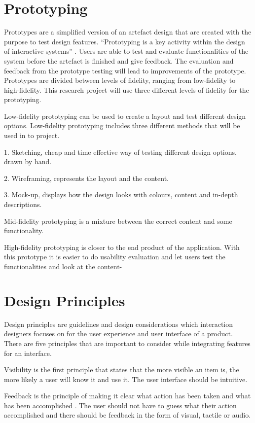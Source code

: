 \section{Prototyping} \label{interactiondesign}
Prototypes are a simplified version of an artefact design that are created with the purpose to test design features. “Prototyping is a key activity within the design of interactive systems” \cite{Buchenau}. Users are able to test and evaluate functionalities of the system before the artefact is finished and give feedback.  The evaluation and feedback from the prototype testing will lead to improvements of the prototype. Prototypes are divided between levels of fidelity, ranging from low-fidelity to high-fidelity. This research project will use three different levels of fidelity for the prototyping.

Low-fidelity prototyping \cite{interactiondesignbook} can be used to create a layout and test different design options. Low-fidelity prototyping includes three different methods that will be used in to project.

1. Sketching, cheap and time effective way of testing different design options, drawn by hand.

2. Wireframing, represents the layout and the content.

3. Mock-up, displays how the design looks with colours, content and in-depth descriptions.

Mid-fidelity prototyping is a mixture between the correct content and some functionality.

High-fidelity prototyping is closer to the end product of the application. With this prototype it is easier to do usability evaluation and let users test the functionalities and look at the content-

\section{Design Principles}
Design principles \cite{DesignP} are guidelines and design considerations which interaction designers focuses on for the user experience and user interface of a product. There are five principles that are important to consider while integrating features for an interface.

Visibility is the first principle that states that the more visible an item is, the more likely a user will know it and use it. \cite{Norman} The user interface should be intuitive.

Feedback is the principle of making it clear what action has been taken and what has been accomplished \cite{Norman}. The user should not have to guess what their action accomplished and there should be feedback in the form of visual, tactile or audio.

